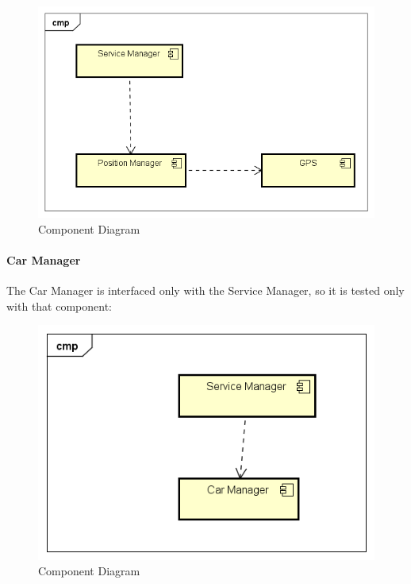 \begin{figure}[H]	
	\centering
	\includegraphics[width=\textwidth]{img/PosMan_SrvMan_int}
	\caption{Component Diagram}
\end{figure}

\paragraph{Car Manager}
The Car Manager is interfaced only with the Service Manager, so it is tested only with that component:

\begin{figure}[H]	
	\centering
	\includegraphics[width=\textwidth]{img/CarMan_SrvMan_int}
	\caption{Component Diagram}
\end{figure}

